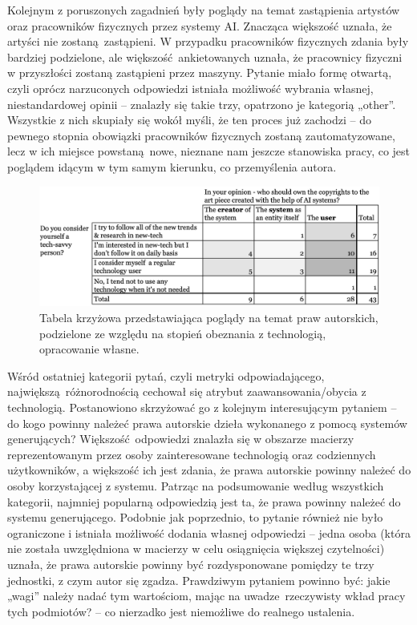 \documentclass[12pt]{article}
\begin{document}
Kolejnym z poruszonych zagadnień były poglądy na temat zastąpienia artystów oraz pracowników fizycznych przez systemy AI. Znacząca większość uznała, że artyści nie zostaną zastąpieni. W przypadku pracowników fizycznych zdania były bardziej podzielone, ale większość ankietowanych uznała, że pracownicy fizyczni w przyszłości zostaną zastąpieni przez maszyny. Pytanie miało formę otwartą, czyli oprócz narzuconych odpowiedzi istniała możliwość wybrania własnej, niestandardowej opinii – znalazły się takie trzy, opatrzono je kategorią „other”. Wszystkie z nich skupiały się wokół myśli, że ten proces już zachodzi – do pewnego stopnia obowiązki pracowników fizycznych zostaną zautomatyzowane, lecz w ich miejsce powstaną nowe, nieznane nam jeszcze stanowiska pracy, co jest poglądem idącym w tym samym kierunku, co przemyślenia autora.

\begin{figure}[H]
    \centering
    \includegraphics[width=\textwidth]{p10}
    \caption{Tabela krzyżowa przedstawiająca poglądy na temat praw autorskich, podzielone ze względu na stopień obeznania z technologią, opracowanie własne.}
    \label{fig:27}
\end{figure}

Wśród ostatniej kategorii pytań, czyli metryki odpowiadającego, największą różnorodnością cechował się atrybut zaawansowania/obycia z technologią. Postanowiono skrzyżować go z kolejnym interesującym pytaniem – do kogo powinny należeć prawa autorskie dzieła wykonanego z pomocą systemów generujących? Większość odpowiedzi znalazła się w obszarze macierzy reprezentowanym przez osoby zainteresowane technologią oraz codziennych użytkowników, a większość ich jest zdania, że prawa autorskie powinny należeć do osoby korzystającej z systemu. Patrząc na podsumowanie według wszystkich kategorii, najmniej popularną odpowiedzią jest ta, że prawa powinny należeć do systemu generującego. Podobnie jak poprzednio, to pytanie również nie było ograniczone i istniała możliwość dodania własnej odpowiedzi – jedna osoba (która nie została uwzględniona w macierzy w celu osiągnięcia większej czytelności) uznała, że prawa autorskie powinny być rozdysponowane pomiędzy te trzy jednostki, z czym autor się zgadza. Prawdziwym pytaniem powinno być: jakie „wagi” należy nadać tym wartościom, mając na uwadze rzeczywisty wkład pracy tych podmiotów? – co nierzadko jest niemożliwe do realnego ustalenia.
\end{document}
